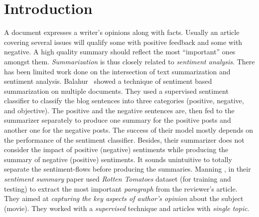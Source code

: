 \documentclass[a4paper]{report}
\begin{document}
\section{Introduction}
 \par A document expresses a writer's opinions along with facts. Usually an article covering several issues will qualify some with positive feedback and some with negative. A high quality summary should reflect the most ``important'' ones amongst them. \emph{Summarization} is thus closely related to \emph{sentiment analysis}. There has been limited work done on the intersection of text summarization and sentiment analysis. Balahur~\cite{conf/paclic/BalahurKSSM09} showed a technique of sentiment based summarization on multiple documents. They used a supervised sentiment classifier to classify the blog sentences into three categories (positive, negative, and objective). 
The positive and the negative sentences are, then fed to the summarizer separately to produce one summary for the positive posts and another one for the negative posts. %
The success of their model mostly depends on the performance of the sentiment classifier. Besides, their summarizer does not consider the impact of positive (negative) sentiments while producing the summary of negative (positive) sentiments. It sounds unintuitive to totally separate the sentiment-flows before producing the summaries. Manning \cite{Beineke+al:04a}, in their \emph{sentiment summary} paper used \emph{Rotten Tomatoes} dataset (for training and testing) to extract the most important \emph{paragraph} from the reviewer's article. They aimed at \emph{capturing the key aspects of author's opinion} about the subject (movie). They worked with a \emph{supervised} technique and articles with \emph{single topic}.
\end{document}
